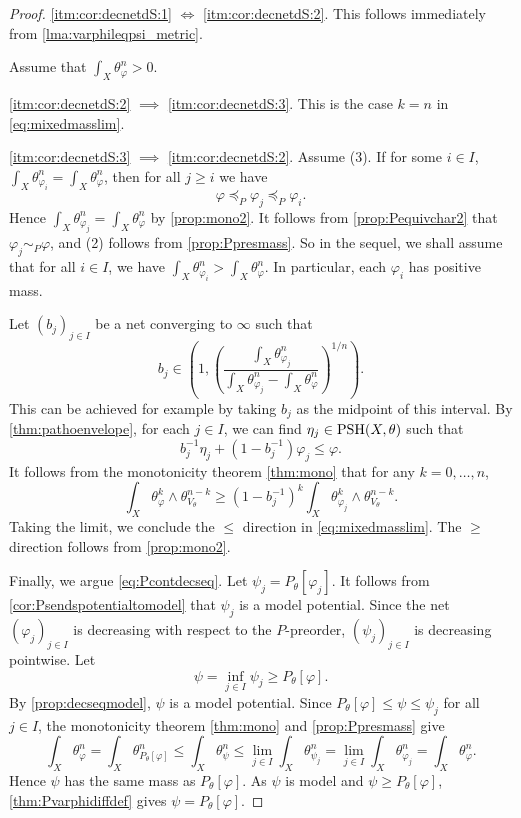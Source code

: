 \begin{proof}
    \ref{itm:cor:decnetdS:1} $\iff$ \ref{itm:cor:decnetdS:2}. This follows immediately from \cref{lma:varphileqpsi_metric}.

    Assume that $\int_X \theta_{\varphi}^n>0$.

    \ref{itm:cor:decnetdS:2} $\implies$ \ref{itm:cor:decnetdS:3}. This is the case $k=n$ in \eqref{eq:mixedmasslim}.

    \ref{itm:cor:decnetdS:3} $\implies$ \ref{itm:cor:decnetdS:2}.
    Assume (3). If for some $i\in I$, $\int_X \theta_{\varphi_i}^n= \int_X \theta_{\varphi}^n$, then for all $j\geq i$ we have
    \[
        \varphi\preceq_P\varphi_j\preceq_P\varphi_i.
    \]
    Hence $\int_X\theta_{\varphi_j}^n=\int_X\theta_{\varphi}^n$ by \cref{prop:mono2}. It follows from \cref{prop:Pequivchar2} that $\varphi_j\sim_P\varphi$, and (2) follows from \cref{prop:Ppresmass}. So in the sequel, we shall assume that for all $i\in I$, we have $\int_X \theta_{\varphi_i}^n>\int_X \theta_{\varphi}^n$.
    In particular, each $\varphi_i$ has positive mass.

    Let $(b_j)_{j\in I}$ be a net converging to $\infty$ such that
    \[
    b_j\in \left( 1, \left(\frac{\int_X \theta_{\varphi_j}^n}{\int_X \theta_{\varphi_j}^n-\int_X \theta_{\varphi}^n}\right)^{1/n} \right).
    \]
    This can be achieved for example by taking $b_j$ as the midpoint of this interval.
    By \cref{thm:pathoenvelope}, for each $j\in I$, we can find $\eta_j\in \mathrm{PSH}(X,\theta)$ such that
    \[
    b_j^{-1}\eta_j +\left(1-b_j^{-1}\right)\varphi_j \leq \varphi.
    \]
    It follows from the monotonicity theorem \cref{thm:mono} that for any $k=0,\ldots,n$,
    \[
    \int_X \theta_{\varphi}^k \wedge \theta_{V_{\theta}}^{n-k}\geq \left(1-b_j^{-1}\right)^k\int_X \theta_{\varphi_j}^k \wedge \theta_{V_{\theta}}^{n-k}.
    \]
    Taking the limit, we conclude the $\leq$ direction in \eqref{eq:mixedmasslim}. The $\geq$ direction follows from \cref{prop:mono2}.

    Finally, we argue \eqref{eq:Pcontdecseq}.
    Let $\psi_j=P_{\theta}[\varphi_j]$. It follows from \cref{cor:Psendspotentialtomodel} that $\psi_j$ is a model potential. Since the net $(\varphi_j)_{j\in I}$ is decreasing with respect to the $P$-preorder, $(\psi_j)_{j\in I}$ is decreasing pointwise. Let
    \[
        \psi=\inf_{j\in I}\psi_j\geq P_{\theta}[\varphi].
    \]
    By \cref{prop:decseqmodel}, $\psi$ is a model potential. Since $P_{\theta}[\varphi]\leq \psi\leq \psi_j$ for all $j\in I$, the monotonicity theorem \cref{thm:mono} and \cref{prop:Ppresmass} give
    \[
        \int_X \theta_{\varphi}^n=\int_X\theta_{P_{\theta}[\varphi]}^n\leq \int_X \theta_{\psi}^n\leq \lim_{j\in I}\int_X \theta_{\psi_j}^n=\lim_{j\in I}\int_X \theta_{\varphi_j}^n=\int_X \theta_{\varphi}^n.
    \]
    Hence $\psi$ has the same mass as $P_{\theta}[\varphi]$. As $\psi$ is model and $\psi\geq P_{\theta}[\varphi]$, \cref{thm:Pvarphidiffdef} gives $\psi=P_{\theta}[\varphi]$.
\end{proof}




